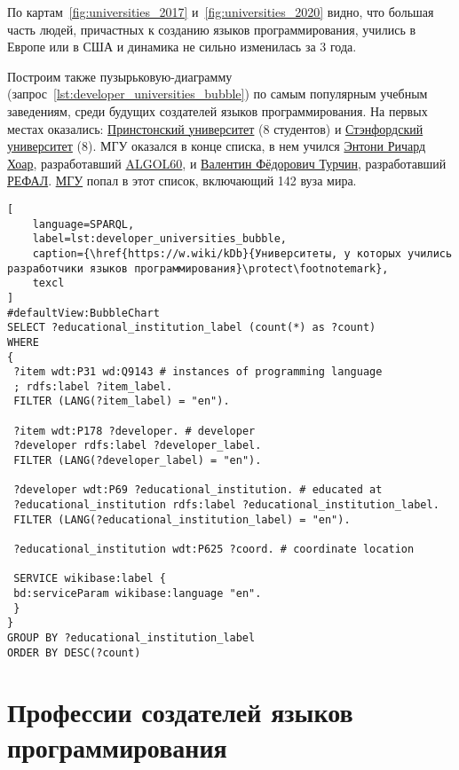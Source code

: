 По картам~\ref{fig:universities_2017} и~\ref{fig:universities_2020} видно, что большая часть людей, причастных к созданию языков программирования, учились в Европе или в США и динамика не сильно изменилась за 3 года.

Построим также пузырьковую-диаграмму (запрос~\ref{lst:developer_universities_bubble}) по самым популярным учебным заведениям, среди будущих создателей языков программирования. На первых местах оказались: \href{https://www.wikidata.org/wiki/Q21578}{Принстонский университет} (8 студентов) и \href{https://www.wikidata.org/wiki/Q41506}{Стэнфордский университет} (8). МГУ оказался в конце списка, в нем учился \href{https://www.wikidata.org/wiki/Q92602}{Энтони Ричард Хоар}, разработавший \href{https://www.wikidata.org/wiki/Q188436}{ALGOL60}, и \href{https://www.wikidata.org/wiki/Q4466506}{Валентин Фёдорович Турчин}, разработавший \href{https://www.wikidata.org/wiki/Q2626418}{РЕФАЛ}. \href{https://www.wikidata.org/wiki/Q13164}{МГУ} попал в этот список, включающий 142 вуза мира.

\begin{lstlisting}[
	language=SPARQL,
	label=lst:developer_universities_bubble,
	caption={\href{https://w.wiki/kDb}{Университеты, у которых учились разработчики языков программирования}\protect\footnotemark},
	texcl
]
#defaultView:BubbleChart
SELECT ?educational_institution_label (count(*) as ?count)
WHERE
{
 ?item wdt:P31 wd:Q9143 # instances of programming language
 ; rdfs:label ?item_label. 
 FILTER (LANG(?item_label) = "en"). 
 
 ?item wdt:P178 ?developer. # developer
 ?developer rdfs:label ?developer_label. 
 FILTER (LANG(?developer_label) = "en"). 
 	
 ?developer wdt:P69 ?educational_institution. # educated at
 ?educational_institution rdfs:label ?educational_institution_label. 
 FILTER (LANG(?educational_institution_label) = "en").
 
 ?educational_institution wdt:P625 ?coord. # coordinate location
 
 SERVICE wikibase:label {
 bd:serviceParam wikibase:language "en".
 } 	
}
GROUP BY ?educational_institution_label
ORDER BY DESC(?count)
\end{lstlisting}

\section{Профессии создателей языков программирования}

